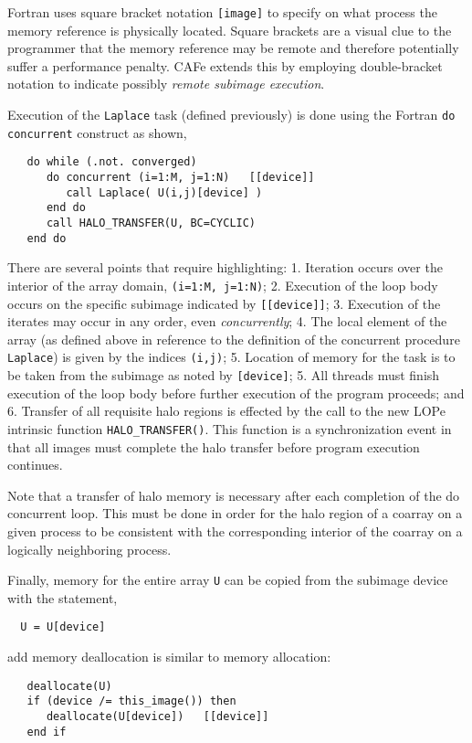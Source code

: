 Fortran uses square bracket notation \texttt{[image]} to specify on what process the
memory reference is physically located.  Square brackets are a visual clue to the
programmer that the memory reference may be remote and therefore potentially suffer a
performance penalty.  CAFe extends this by employing double-bracket notation to indicate
possibly \emph{remote subimage execution}.

Execution of the \texttt{Laplace} task (defined previously) is done using the Fortran \texttt{do}
\texttt{concurrent} construct as shown,
\begin{verbatim}
   do while (.not. converged)
      do concurrent (i=1:M, j=1:N)   [[device]]
         call Laplace( U(i,j)[device] )
      end do
      call HALO_TRANSFER(U, BC=CYCLIC)
   end do
\end{verbatim}
There are several points that require highlighting: 1. Iteration occurs over the interior
of the array domain, \texttt{(i=1:M, j=1:N)}; 2. Execution of the loop body occurs on the
specific subimage indicated by \texttt{[[device]]}; 3. Execution of the iterates may occur
in any order, even \emph{concurrently}; 4. The local element of the array (as
defined above in reference to the definition of the concurrent procedure
\texttt{Laplace}) is given by the indices \texttt{(i,j)}; 5. Location of memory for the
task is to be taken from the subimage as noted by \texttt{[device]}; 5. All threads must finish
execution of the loop body before further execution of the program proceeds; and 6. Transfer of
all requisite halo regions is effected by the call to the new LOPe intrinsic function
\texttt{HALO\_TRANSFER()}.  This function is a synchronization event in that all images must
complete the halo transfer before program execution continues.

Note that a transfer of halo memory is necessary after each completion of the do concurrent loop.
This must be done in order for the halo region of a coarray on a given process to be consistent
with the corresponding interior of the coarray on a logically neighboring process.


Finally, memory for the entire array \texttt{U} can be copied from the subimage device
with the statement,
\begin{verbatim}
  U = U[device]
\end{verbatim}
add memory deallocation is similar to memory allocation:
\begin{verbatim}
   deallocate(U)
   if (device /= this_image()) then
      deallocate(U[device])   [[device]]
   end if
\end{verbatim}


